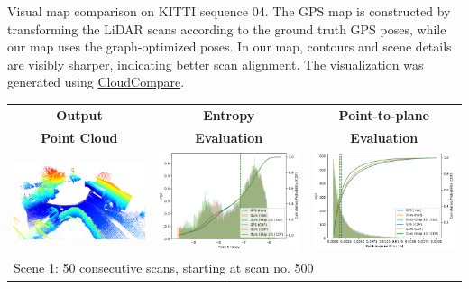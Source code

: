 \begin{table}[h]
    \caption{Visual map comparison on KITTI sequence 04. The GPS map is constructed by transforming the LiDAR scans according to the ground truth GPS poses, while our map uses the graph-optimized poses. In our map, contours and scene details are visibly sharper, indicating better scan alignment. The visualization was generated using \href{https://www.danielgm.net/cc/}{CloudCompare}.}
    \label{tab:map-eval-viz}
\end{table}


\begin{table}[h]
    \centering
    {\small
        \begin{tabular}{ccc}
            \textbf{Output}                                                                            & \textbf{Entropy}    & \textbf{Point-to-plane} \\
            \textbf{Point Cloud}                                                                       & \textbf{Evaluation} & \textbf{Evaluation}     \\
            \hline \hline
            \includegraphics[width=0.3\linewidth]{images/map_eval/viz-500--50.png}                     &
            \includegraphics[width=0.31\linewidth]{images/map_eval/entropy_gps_ours_skip-500--50.pdf}  &
            \includegraphics[width=0.31\linewidth]{images/map_eval/p2plane_gps_ours_skip-500--50.pdf}                                                  \\
            \hline
            \multicolumn{3}{l}{Scene 1: 50 consecutive scans, starting at scan no. 500}                                                                \\

\end{tabular}}
\end{table}
